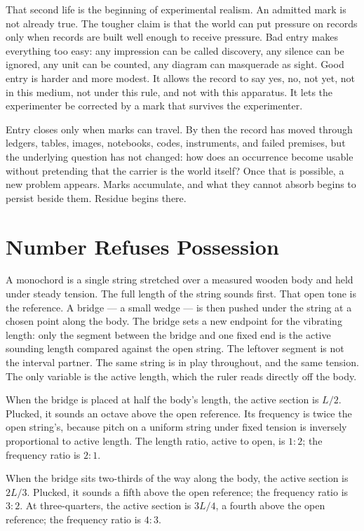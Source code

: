 \begin{chapteressay}
That second life is the beginning of experimental realism. An admitted mark is
not already true. The tougher claim is that the world can put pressure on
records only when records are built well enough to receive pressure. Bad entry
makes everything too easy: any impression can be called discovery, any silence
can be ignored, any unit can be counted, any diagram can masquerade as sight.
Good entry is harder and more modest. It allows the record to say yes, no, not
yet, not in this medium, not under this rule, and not with this apparatus. It
lets the experimenter be corrected by a mark that survives the experimenter.

Entry closes only when marks can travel. By then the record has moved through
ledgers, tables, images, notebooks, codes, instruments, and failed premises,
but the underlying question has not changed: how does an occurrence become
usable without pretending that the carrier is the world itself? Once that is
possible, a new problem appears. Marks accumulate, and what they cannot absorb
begins to persist beside them. Residue begins there.
\end{chapteressay}

\section{Number Refuses Possession}

A monochord is a single string stretched over a measured wooden body and
held under steady tension. The full length of the string sounds first. That
open tone is the reference. A bridge --- a small wedge --- is then pushed
under the string at a chosen point along the body. The bridge sets a
new endpoint for the vibrating length: only the segment between the bridge
and one fixed end is the active sounding length compared against the open
string. The leftover segment is not the interval partner. The same string
is in play throughout, and the same tension. The only variable is the active
length, which the ruler reads directly off the body.

When the bridge is placed at half the body's length, the active section is
$L/2$. Plucked, it sounds an octave above the open reference. Its frequency
is twice the open string's, because pitch on a uniform string under fixed
tension is inversely proportional to active length. The length ratio,
active to open, is $1{:}2$; the frequency ratio is $2{:}1$.

When the bridge sits two-thirds of the way along the body, the active
section is $2L/3$. Plucked, it sounds a fifth above the open reference; the
frequency ratio is $3{:}2$. At three-quarters, the active section is
$3L/4$, a fourth above the open reference; the frequency ratio is $4{:}3$.

